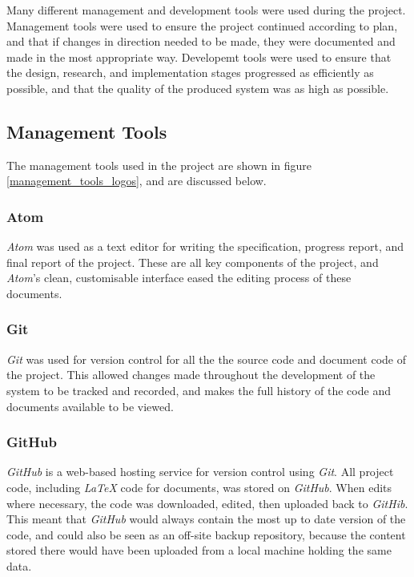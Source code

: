 
Many different management and development tools were used during the project. Management tools were used to ensure the project continued according to plan, and that if changes in direction needed to be made, they were documented and made in the most appropriate way. Developemt tools were used to ensure that the design, research, and implementation stages progressed as efficiently as possible, and that the quality of the produced system was as high as possible.

\subsection{Management Tools}
\label{management_tools}
The management tools used in the project are shown in figure \ref{management_tools_logos}, and are discussed below.

\subsubsection{Atom \cite{atom}}
\textit{Atom} was used as a text editor for writing the specification, progress report, and final report of the project. These are all key components of the project, and \textit{Atom}'s clean, customisable interface eased the editing process of these documents.

\subsubsection{Git \cite{git}}
\textit{Git} was used for version control for all the the source code and document code of the project. This allowed changes made throughout the development of the system to be tracked and recorded, and makes the full history of the code and documents available to be viewed.

\subsubsection{GitHub \cite{github}}
\textit{GitHub} is a web-based hosting service for version control using \textit{Git}. All project code, including \textit{LaTeX} code for documents, was stored on \textit{GitHub}. When edits where necessary, the code was downloaded, edited, then uploaded back to \textit{GitHib}. This meant that \textit{GitHub} would always contain the most up to date version of the code, and could also be seen as an off-site backup repository, because the content stored there would have been uploaded from a local machine holding the same data.

